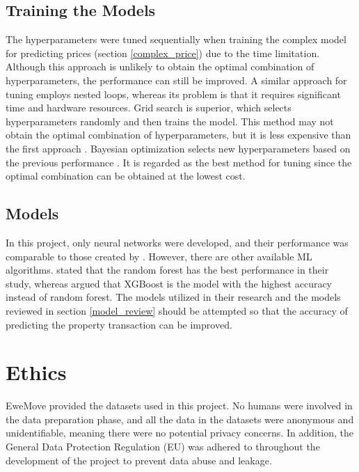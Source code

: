 \documentclass[12pt,twoside]{report}
\begin{document}
\subsection{Training the Models}
The hyperparameters were tuned sequentially when training the complex model for predicting prices (section \ref{complex_price}) due to the time limitation. Although this approach is unlikely to obtain the optimal combination of hyperparameters, the performance can still be improved. A similar approach for tuning employs nested loops, whereas its problem is that it requires significant time and hardware resources. Grid search is superior, which selects hyperparameters randomly and then trains the model. This method may not obtain the optimal combination of hyperparameters, but it is less expensive than the first approach \citep{RN38}. Bayesian optimization selects new hyperparameters based on the previous performance \citep{RN38}. It is regarded as the best method for tuning since the optimal combination can be obtained at the lowest cost. 

\subsection{Models}
In this project, only neural networks were developed, and their performance was comparable to those created by \citet{RN37}. However, there are other available ML algorithms. \citet{RN17} stated that the random forest has the best performance in their study, whereas \citet{RN20} argued that XGBoost is the model with the highest accuracy instead of random forest. The models utilized in their research and the models reviewed in section \ref{model_review} should be attempted so that the accuracy of predicting the property transaction can be improved. 

\section{Ethics}
EweMove provided the datasets used in this project. No humans were involved in the data preparation phase, and all the data in the datasets were anonymous and unidentifiable, meaning there were no potential privacy concerns. In addition, the General Data Protection Regulation (EU) was adhered to throughout the development of the project to prevent data abuse and leakage. 
\end{document}
